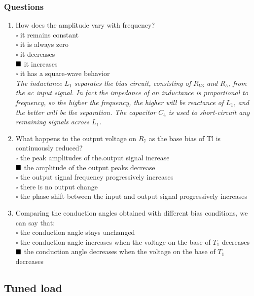 \documentclass[12pt,a4paper]{report}
\begin{document}
\subsubsection{Questions}
\begin{enumerate}
    \item How does the amplitude vary with frequency?\\
        \(\square\) it remains constant \\
        \(\square\) it is always zero \\
        \(\square\) it decreases \\
        \(\textcolor{black}{\blacksquare}\) it increases \\
        \(\square\) it has a square-wave behavior\\
         \textit{The inductance $L_1$ separates the bias circuit, consisting of $R_{V3}$ and $R_5$, from the ac input signal. In fact the impedance of an inductance is proportional to frequency, so the higher the frequency, the higher will be reactance of $L_1$, and the better will be the separation. The capacitor $C_4$ is used to short-circuit any remaining signals across $L_1$.}
    \item What happens to the output voltage on $R_7$ as the base bias of Tl is continuously reduced?\\
        \(\square\) the peak amplitudes of the.output signal increase\\
        \(\textcolor{black}{\blacksquare}\) the amplitude of the output peaks decrease\\
        \(\square\) the output signal frequency progressively increases\\
        \(\square\) there is no output change\\
        \(\square\) the phase shift between the input and output signal progressively increases
    \item Comparing the conduction angles obtained with different bias conditions, we can say that:\\
        \(\square\) the conduction angle stays unchanged\\
        \(\square\) the conduction angle increases when the voltage on the base of $T_1$ decreases\\
        \(\textcolor{black}{\blacksquare}\) the conduction angle decreases when the voltage on the base of $T_1$ decreases
\end{enumerate}
\subsection{Tuned load}
\end{document}
